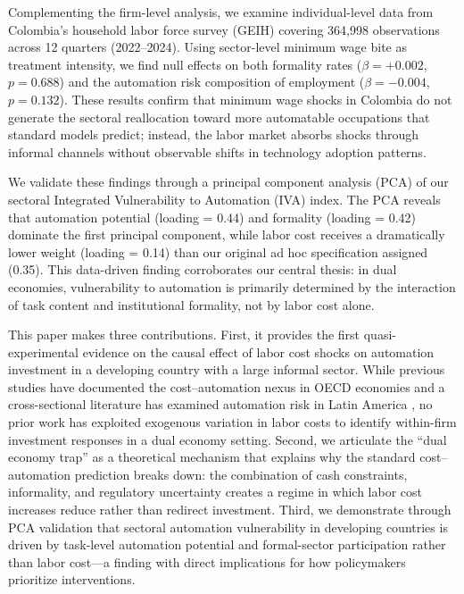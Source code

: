 \documentclass[5p,times,authoryear]{elsarticle}
\begin{document}
Complementing the firm-level analysis, we examine individual-level data from Colombia's household labor force survey (GEIH) covering 364,998 observations across 12 quarters (2022--2024). Using sector-level minimum wage bite as treatment intensity, we find null effects on both formality rates ($\beta = +0.002$, $p = 0.688$) and the automation risk composition of employment ($\beta = -0.004$, $p = 0.132$). These results confirm that minimum wage shocks in Colombia do not generate the sectoral reallocation toward more automatable occupations that standard models predict; instead, the labor market absorbs shocks through informal channels without observable shifts in technology adoption patterns.

We validate these findings through a principal component analysis (PCA) of our sectoral Integrated Vulnerability to Automation (IVA) index. The PCA reveals that automation potential (loading = 0.44) and formality (loading = 0.42) dominate the first principal component, while labor cost receives a dramatically lower weight (loading = 0.14) than our original ad hoc specification assigned (0.35). This data-driven finding corroborates our central thesis: in dual economies, vulnerability to automation is primarily determined by the interaction of task content and institutional formality, not by labor cost alone.

This paper makes three contributions. First, it provides the first quasi-experimental evidence on the causal effect of labor cost shocks on automation investment in a developing country with a large informal sector. While previous studies have documented the cost--automation nexus in OECD economies \citep{graetz2018, koch2021, adachi2022} and a cross-sectional literature has examined automation risk in Latin America \citep{bid2023, fedesarrollo2023, morales2023risk}, no prior work has exploited exogenous variation in labor costs to identify within-firm investment responses in a dual economy setting. Second, we articulate the ``dual economy trap'' as a theoretical mechanism that explains why the standard cost--automation prediction breaks down: the combination of cash constraints, informality, and regulatory uncertainty creates a regime in which labor cost increases reduce rather than redirect investment. Third, we demonstrate through PCA validation that sectoral automation vulnerability in developing countries is driven by task-level automation potential and formal-sector participation rather than labor cost---a finding with direct implications for how policymakers prioritize interventions.
\end{document}
